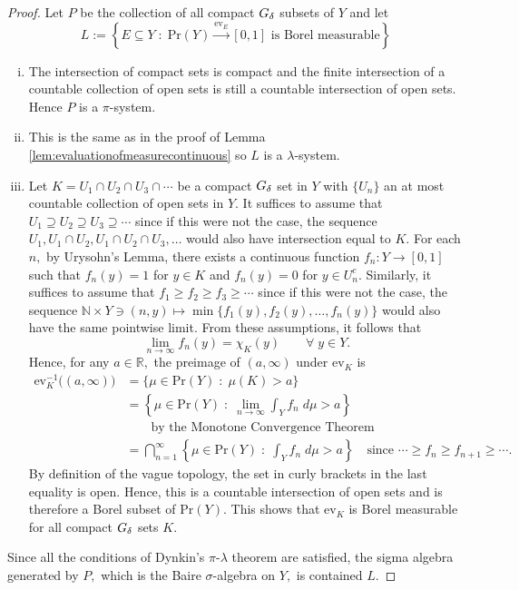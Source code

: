 \documentclass[12pt]{article}
\edef\t{\pgfmathresult}%
\theoremstyle{theorem}
\theoremstyle{definition}
\numberwithin{equation}{section}
\let\l=\lambda \let\r=\rho
\let\s=\sigma \let\t=\tau \let\u=\upsilon \let\f=\phi \let\c=\chi
\newcommand{\be}{\begin{equation}}
\newcommand{\ee}{\end{equation}}
\newcommand{\bprf}{\begin{proof}}
\newcommand{\eprf}{\end{proof}}
\newcommand{\<}{\langle}
\renewcommand{\>}{\rangle}
\def\R{{{\mathbb R}}}
\def\N{{{\mathbb N}}}
\begin{document}
\bprf
Let $P$ be the collection of all compact $G_{\delta}$ subsets of $Y$
and let
\be
L:=
\left\{E\subseteq Y\;:\;\mathrm{Pr}(Y)\xrightarrow{\mathrm{ev}_{E}}[0,1]\text{ is Borel measurable}\right\}
\ee
\begin{enumerate}[i.]
\setlength{\itemsep}{0pt}
\item
The intersection of compact sets is compact and
the finite intersection of a countable collection of open sets is 
still a countable intersection
of open sets. Hence $P$ is a $\pi$-system. 

\item
This is the same as in the proof of 
Lemma \ref{lem:evaluationofmeasurecontinuous} so $L$ is a $\l$-system. 

\item
Let $K=U_1\cap U_2\cap U_3\cap\cdots$ be a compact $G_{\delta}$ set in 
$Y$ with $\{U_{n}\}$ an at most countable collection of open sets in $Y.$ 
It suffices to assume that 
$U_{1}\supseteq U_{2}\supseteq U_{3}\supseteq\cdots$
since if this were not the case, the sequence $U_{1}, U_{1}\cap U_{2}, 
U_{1}\cap U_{2}\cap U_{3}, \dots$ would also have intersection equal to $K.$ 
For each $n,$ by Urysohn's Lemma, there exists
a continuous function $f_{n}:Y\to[0,1]$ such that $f_{n}(y)=1$ for $y\in K$ and 
$f_{n}(y)=0$ for $y\in U_{n}^{c}.$ Similarly, it suffices to assume that 
$f_{1}\ge f_{2}\ge f_{3}\ge\cdots$ since if this were not the case, 
the sequence 
$\N\times Y\ni(n,y)\mapsto\min\big\{f_{1}(y),f_{2}(y),\dots,f_{n}(y)\big\}$
would also have the same pointwise limit. From these assumptions, it
follows that 
\be
\lim_{n\to\infty}f_{n}(y)=\chi_{K}(y)\qquad\forall\;y\in Y. 
\ee
Hence, for any $a\in\R,$ the preimage of $(a,\infty)$ under $\mathrm{ev}_{K}$
is 
\be
\begin{split}
\mathrm{ev}_{K}^{-1}\big((a,\infty)\big)&=\big\{\mu\in\mathrm{Pr}(Y)\;:\;\mu(K)>a\big\}\\
&=\left\{\mu\in\mathrm{Pr}(Y)\;:\;\lim_{n\to\infty}\int_{Y}f_{n}\;d\mu>a\right\}\\
&\qquad\text{by the Monotone Convergence Theorem}\\
&=\bigcap_{n=1}^{\infty}\left\{\mu\in\mathrm{Pr}(Y)\;:\;\int_{Y}f_{n}\;d\mu>a\right\}\quad\text{since $\cdots\ge f_{n}\ge f_{n+1}\ge\cdots$}.
\end{split}
\ee
By definition of the vague topology, the set in curly brackets in the last equality
is open. Hence, this is a countable intersection of open sets and is therefore
a Borel subset of $\mathrm{Pr}(Y).$ 
This shows that $\mathrm{ev}_{K}$ is Borel measurable for all 
compact $G_{\delta}$ sets $K.$ 
\end{enumerate}
Since all the conditions of Dynkin's $\pi$-$\l$ theorem are 
satisfied, the sigma algebra generated by %
$P,$
which is the Baire $\s$-algebra on $Y,$ is contained $L.$ 
\eprf
\end{document}
